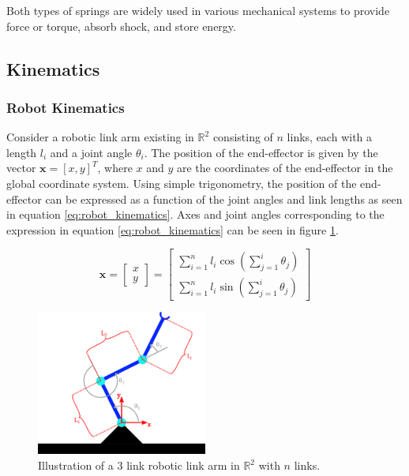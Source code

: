 Both types of springs are widely used in various mechanical systems to provide force or torque, absorb shock, and store energy.

\subsection{Kinematics}
    \subsubsection{Robot Kinematics}
    \label{sec:robot_kinematics}
Consider a robotic link arm existing in $\mathbb{R}^2$ consisting of $n$ links, each with a length $l_i$ and a joint angle $\theta_i$. The position of the end-effector is given by the vector $\bm{x} = [x, y]^T$, where $x$ and $y$ are the coordinates of the end-effector in the global coordinate system. Using simple trigonometry, the position of the end-effector can be expressed as a function of the joint angles and link lengths as seen in equation \ref{eq:robot_kinematics}. 
Axes and joint angles corresponding to the expression in equation \ref{eq:robot_kinematics} can be seen in figure \ref{fig:robotic_link_arm}. 

\begin{equation}
    \label{eq:robot_kinematics}
    \bm{x} = \begin{bmatrix}
        x \\
        y
    \end{bmatrix} = \begin{bmatrix}
        \sum_{i=1}^{n} l_i \cos\left(\sum_{j=1}^{i} \theta_j\right) \\
        \sum_{i=1}^{n} l_i \sin\left(\sum_{j=1}^{i} \theta_j\right)
    \end{bmatrix}
\end{equation}

\begin{figure}[H]
    \centering
    \includegraphics[width=0.5\textwidth]{Images/manipulator_inkscape.png}
    \caption{Illustration of a 3 link robotic link arm in $\mathbb{R}^2$ with $n$ links.}
    \label{fig:robotic_link_arm}
\end{figure}


